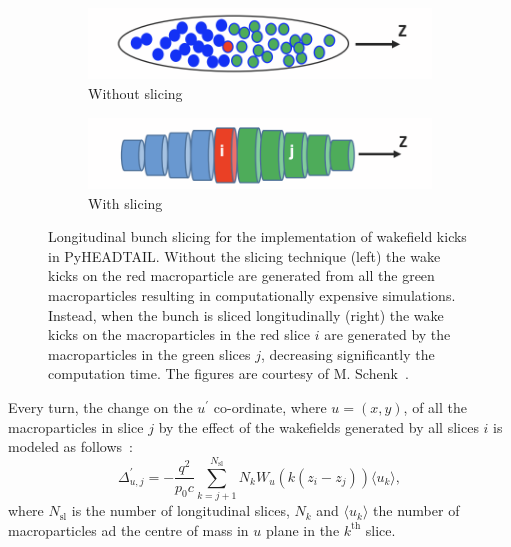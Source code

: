 {\begin{enumerate}
    \begin{figure}[!ht]
        \centering
        \begin{subfigure}[t]{0.45\textwidth}
            \centering
            \includegraphics[width=1\textwidth]{images/Ch2/before_slicing.png}
            \caption{Without slicing}
        \end{subfigure}
        \hfill
        \begin{subfigure}[t]{0.45\textwidth}
            \centering
            \includegraphics[width=1\textwidth]{images/Ch2/after_slicing.png}
            \caption{With slicing}
        \end{subfigure}
        \hfill
         \caption{Longitudinal bunch slicing for the implementation of wakefield kicks in PyHEADTAIL. Without the slicing technique (left) the wake kicks on the red macroparticle are generated from all the green macroparticles resulting in computationally expensive simulations. Instead, when the bunch is sliced longitudinally (right) the wake kicks on the macroparticles in the red slice $i$ are generated by the macroparticles in the green slices $j$, decreasing significantly the computation time. The figures are courtesy of M. Schenk~\cite{pyheadtail_schenk}.} %
         \label{fig:longitudinal_slicing_wakefields}
     \end{figure}
       
    Every turn, the change on the $u^\prime$ co-ordinate, where $u=(x,y)$, of all the macroparticles in slice $j$ by the effect of the wakefields generated by all slices $i$ is modeled as follows~\cite{pyheadtail_manual_adrian}:
    \begin{equation}\label{eq:wakefield_kick_pyheadtail}
        \Delta_{u,j}^\prime = - \frac{q^2}{p_0 c}\sum_{k=j+1}^{N_\mathrm{sl}}N_k W_u(k(z_i-z_j))\langle u_k \rangle,
    \end{equation}
    where $N_\mathrm{sl}$ is the number of longitudinal slices, $N_k$ and $\langle u_k \rangle$ the number of macroparticles ad the centre of mass in $u$ plane in the $k^\mathrm{th}$ slice.
    

\end{enumerate}}
